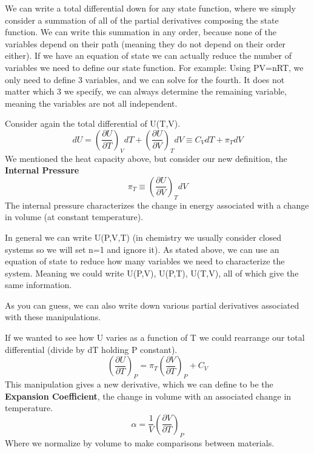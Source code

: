\documentclass{article}
\newcommand{\be}{\begin{equation}}
\newcommand{\ee}{\end{equation}}
\newcommand{\pd}{\partial}
\begin{document}
We can write a total differential down for any state function, where we simply consider a summation of all of the partial derivatives composing the state function. 
We can write this summation in any order, because none of the variables depend on their path (meaning they do not depend on their order either).
If we have an equation of state we can actually reduce the number of variables we need to define our state function.
For example: Using PV=nRT, we only need to define 3 variables, and we can solve for the fourth. 
It does not matter which 3 we specify, we can always determine the remaining variable, meaning the variables are not all independent. 

Consider again the total differential of U(T,V). 
\be
dU = \left(\frac{\pd U}{\pd T}\right)_VdT + \left(\frac{\pd U}{\pd V}\right)_T dV \equiv C_VdT + \pi_TdV 
\ee
We mentioned the heat capacity above, but consider our new definition, the \textbf{Internal Pressure}
\be
\pi_T \equiv \left(\frac{\pd U}{\pd V}\right)_T dV 
\ee
The internal pressure characterizes the change in energy associated with a change in volume (at constant temperature). 

In general we can write U(P,V,T) (in chemistry we usually consider closed systems so we will set n=1 and ignore it). 
As stated above, we can use an equation of state to reduce how many variables we need to characterize the system.
Meaning we could write U(P,V), U(P,T), U(T,V), all of which give the same information. 

As you can guess, we can also write down various partial derivatives associated with these manipulations. 

If we wanted to see how U varies as a function of T we could rearrange our total differential (divide by dT holding P constant). 
\be
\left(\frac{\pd U}{\pd T}\right)_P = \pi_T\left(\frac{\pd V}{\pd T}\right)_P + C_V
\ee
This manipulation gives a new derivative, which we can define to be the \textbf{Expansion Coefficient}, the change in volume with an associated change in temperature. 
\be
\alpha = \frac{1}{V} \left(\frac{\pd V}{\pd T}\right)_P
\ee
Where we normalize by volume to make comparisons between materials.
\end{document}
